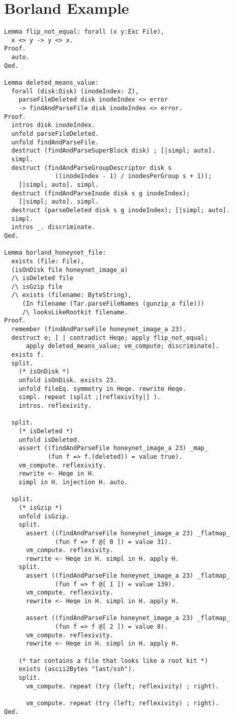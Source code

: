 \documentclass[nocopyrightspace]{sigplanconf}
\begin{document}
\section{Borland Example}
\begin{lstlisting}
Lemma flip_not_equal: forall (x y:Exc File),
  x <> y -> y <> x.
Proof.
  auto.
Qed.

Lemma deleted_means_value: 
  forall (disk:Disk) (inodeIndex: Z), 
    parseFileDeleted disk inodeIndex <> error 
    -> findAndParseFile disk inodeIndex <> error.
Proof.
  intros disk inodeIndex.
  unfold parseFileDeleted.
  unfold findAndParseFile.
  destruct (findAndParseSuperBlock disk) ; [|simpl; auto].
  simpl.
  destruct (findAndParseGroupDescriptor disk s 
              ((inodeIndex - 1) / inodesPerGroup s + 1)); 
    [|simpl; auto]. simpl.
  destruct (findAndParseInode disk s g inodeIndex); 
    [|simpl; auto]. simpl.
  destruct (parseDeleted disk s g inodeIndex); [|simpl; auto]. 
  simpl.
  intros _. discriminate.
Qed.

Lemma borland_honeynet_file:
  exists (file: File),
  (isOnDisk file honeynet_image_a)
  /\ isDeleted file
  /\ isGzip file
  /\ exists (filename: ByteString),
     (In filename (Tar.parseFileNames (gunzip_a file)))
     /\ looksLikeRootkit filename.
Proof.
  remember (findAndParseFile honeynet_image_a 23).
  destruct e; [ | contradict Heqe; apply flip_not_equal; 
      apply deleted_means_value; vm_compute; discriminate].
  exists f.
  split. 
    (* isOnDisk *)
    unfold isOnDisk. exists 23.
    unfold fileEq. symmetry in Heqe. rewrite Heqe.
    simpl. repeat (split ;[reflexivity|] ).
    intros. reflexivity.

  split.
    (* isDeleted *)
    unfold isDeleted.
    assert ((findAndParseFile honeynet_image_a 23) _map_ 
            (fun f => f.(deleted)) = value true).
    vm_compute. reflexivity.
    rewrite <- Heqe in H.
    simpl in H. injection H. auto.

  split.
    (* isGzip *)
    unfold isGzip. 
    split.
      assert ((findAndParseFile honeynet_image_a 23) _flatmap_
              (fun f => f @[ 0 ]) = value 31).
      vm_compute. reflexivity.
      rewrite <- Heqe in H. simpl in H. apply H.
    split.
      assert ((findAndParseFile honeynet_image_a 23) _flatmap_
              (fun f => f @[ 1 ]) = value 139).
      vm_compute. reflexivity.
      rewrite <- Heqe in H. simpl in H. apply H.

      assert ((findAndParseFile honeynet_image_a 23) _flatmap_
              (fun f => f @[ 2 ]) = value 8).
      vm_compute. reflexivity.
      rewrite <- Heqe in H. simpl in H. apply H.
      
    (* tar contains a file that looks like a root kit *)
    exists (ascii2Bytes "last/ssh").
    split.
      vm_compute. repeat (try (left; reflexivity) ; right).

      vm_compute. repeat (try (left; reflexivity) ; right).
Qed.
\end{lstlisting}
\end{document}
